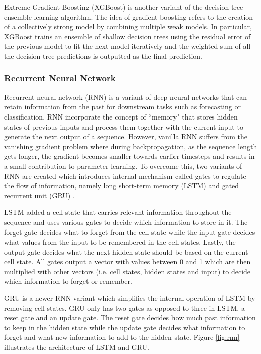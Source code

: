 \documentclass{article}
\begin{document}
Extreme Gradient Boosting (XGBoost) \cite{xgboost} is another variant of the decision tree ensemble learning algorithm. The idea of gradient boosting refers to the creation of a collectively strong model by combining multiple weak models. In particular, XGBoost trains an ensemble of shallow decision trees using the residual error of the previous model to fit the next model iteratively and the weighted sum of all the decision tree predictions is outputted as the final prediction.

\subsubsection{Recurrent Neural Network}
Recurrent neural network (RNN) \cite{rnn} is a variant of deep neural networks that can retain information from the past for downstream tasks such as forecasting or classification. RNN incorporate the concept of ``memory" that stores hidden states of previous inputs and process them together with the current input to generate the next output of a sequence. However, vanilla RNN suffers from the vanishing gradient problem where during backpropagation, as the sequence length gets longer, the gradient becomes smaller towards earlier timesteps and results in a small contribution to parameter learning. To overcome this, two variants of RNN are created which introduces internal mechanism called gates to regulate the flow of information, namely long short-term memory (LSTM) \cite{lstm} and gated recurrent unit (GRU) \cite{gru}.

LSTM added a cell state that carries relevant information throughout the sequence and uses various gates to decide which information to store in it. The forget gate decides what to forget from the cell state while the input gate decides what values from the input to be remembered in the cell states. Lastly, the output gate decides what the next hidden state should be based on the current cell state. All gates output a vector with values between 0 and 1 which are then multiplied with other vectors (i.e. cell states, hidden states and input) to decide which information to forget or remember.

GRU is a newer RNN variant which simplifies the internal operation of LSTM by removing cell states. GRU only has two gates as opposed to three in LSTM, a reset gate and an update gate. The reset gate decides how much past information to keep in the hidden state while the update gate decides what information to forget and what new information to add to the hidden state. Figure \ref{fig:rnn} illustrates the architecture of LSTM and GRU.
\end{document}
